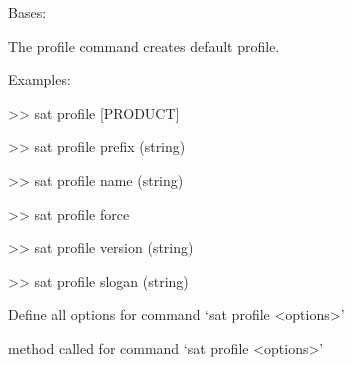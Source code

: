 \documentclass[a4paper,10pt,english]{sphinxmanual}
\begin{document}
\begin{fulllineitems}
\label{\detokenize{apidoc_commands/commands:commands.profile.Command}}
Bases: 

The profile command creates default profile.

\begin{DUlineblock}{0em}
\item[] Examples: 
\item[] \textgreater{}\textgreater{} sat profile {[}PRODUCT{]} 
\item[] \textgreater{}\textgreater{} sat profile \textendash{}prefix (string)
\item[] \textgreater{}\textgreater{} sat profile \textendash{}name (string)
\item[] \textgreater{}\textgreater{} sat profile \textendash{}force
\item[] \textgreater{}\textgreater{} sat profile \textendash{}version (string) 
\item[] \textgreater{}\textgreater{} sat profile \textendash{}slogan (string) 
\end{DUlineblock}

\begin{fulllineitems}
\label{\detokenize{apidoc_commands/commands:commands.profile.Command.getParser}}
Define all options for command ‘sat profile \textless{}options\textgreater{}’

\end{fulllineitems}


\begin{fulllineitems}
\label{\detokenize{apidoc_commands/commands:commands.profile.Command.name}}
\end{fulllineitems}


\begin{fulllineitems}
\label{\detokenize{apidoc_commands/commands:commands.profile.Command.run}}
method called for command ‘sat profile \textless{}options\textgreater{}’

\end{fulllineitems}


\end{fulllineitems}
\end{document}

